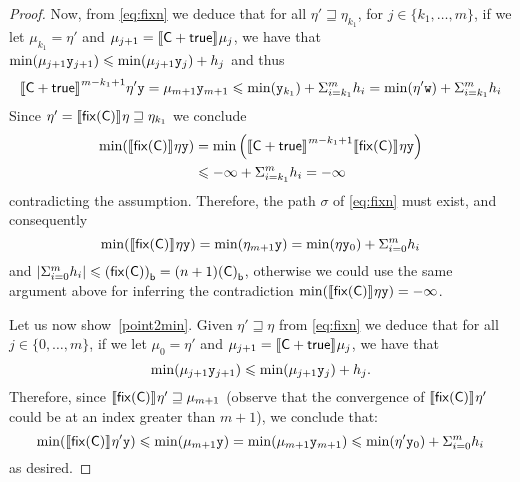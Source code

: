 \begin{proof}
  Now, from \eqref{eq:fixn} we deduce that for all
  \(\eta' \sqsupseteq \eta_{k_1}\), for \(j \in \{ k_1, \ldots, m\}\),
  if we let \(\mu_{k_1} = \eta'\) and
  \(\mu_{j+1} = \semi{\com \ndet \tru} \mu_j\), we have that
  \(\min(\mu_{j+1} \var[y]_{j+1}) \leq \min(\mu_{j+1} \var[y]_{j}) +
  h_j\) and thus
  \begin{equation*}
    \semi{\com \ndet \tru}^{m-k_1+1} \eta' \var[y] = \mu_{m+1}
    \var[y]_{m+1} \leq 
    \min(\var[y]_{k_1}) + \Sigma_{i=k_1}^m h_i = \min(\eta' \var[w]) + \Sigma_{i=k_1}^m h_i
  \end{equation*}
  Since \(\eta' = \semi{\fix{\com}} \eta \sqsupseteq \eta_{k_1}\) we conclude
  \begin{align*}
    \min(\semi{\fix{\com}} \eta \var[y])
    & = \min\left(\semi{\com \ndet \tru}^{m-k_1+1} \semi{\fix{\com}} \eta \var[y]\right) \\
    & \leq -\infty + \Sigma_{i=k_1}^m h_i = -\infty
  \end{align*}
  contradicting the assumption.  Therefore, the path \(\sigma\) of
  \eqref{eq:fixn} must exist, and consequently
  \[\min(\semi{\fix{\com}} \eta \var[y]) = \min(\eta_{m+1} \var[y]) =
    \min(\eta \var[y]_0) + \Sigma_{i=0}^m h_i\] and
  \(\left|\Sigma_{i=0}^m h_i\right| \leq \lbound{\fix{\com}}=(n+1)\lbound{\com}\),
  otherwise we could use the same argument above for inferring the
  contradiction \(\min(\semi{\fix{\com}} \eta \var[y]) = -\infty\).

  \medskip

  Let us now show\ \ref{point2min}. Given
  \(\eta' \sqsupseteq \eta\) from \eqref{eq:fixn} we deduce that for
  all \(j \in \{ 0, \ldots, m\}\), if we let \(\mu_0 = \eta'\) and
  \(\mu_{j+1} = \semi{\com \ndet \tru} \mu_j\), we have that
  \[
    \min(\mu_{j+1} \var[y]_{j+1}) \leq \min(\mu_{j+1} \var[y]_{j}) +
    h_j. \]
  Therefore, since \(\semi{\fix{\com}} \eta' \sqsupseteq \mu_{m+1}\)
  (observe that the convergence of \(\semi{\fix{\com}} \eta' \) could
  be at an index greater than \(m+1\)), we conclude that:
  \[\min(\semi{\fix{\com}} \eta' \var[y]) \leq \min(\mu_{m+1}
  \var[y]) = \min(\mu_{m+1} \var[y]_{m+1}) \leq \min(\eta' \var[y]_0)
  + \Sigma_{i=0}^m h_i\] as desired.
\end{proof}
